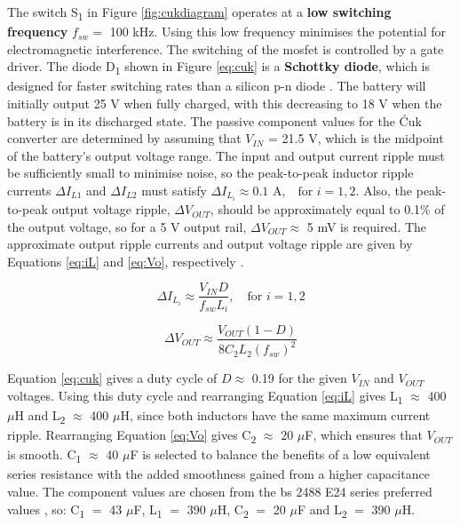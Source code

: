 The switch S\textsubscript{1} in Figure \ref{fig:cukdiagram} operates at a \textbf{low switching frequency} $f_{sw} =$ 100 kHz. Using this low frequency minimises the potential for electromagnetic interference. The switching of the \acrshort{mosfet} is controlled by a gate driver. The diode D\textsubscript{1} shown in Figure \ref{eq:cuk} is a \textbf{Schottky diode}, which is designed for faster switching rates than a silicon p-n diode \cite{Schottky}. The battery will initially output 25 V when fully charged, with this decreasing to 18 V when the battery is in its discharged state. The passive component values for the Ćuk converter are determined by assuming that $V_{IN}$ = 21.5 V, which is the midpoint of the battery's output voltage range. The input and output current ripple must be sufficiently small to minimise noise, so the peak-to-peak inductor ripple currents $\Delta I_{L1}$ and $\Delta I_{L2}$ must satisfy $\Delta I_{L_{i}} \approx 0.1$ A,$\quad \text{for } i = 1, 2$. Also, the peak-to-peak output voltage ripple, $\Delta V_{OUT}$, should be approximately equal to 0.1\% of the output voltage, so for a 5 V output rail,  $\Delta V_{OUT} \approx $ 5 mV is required. The approximate output ripple currents and output voltage ripple are given by Equations \ref{eq:iL} and \ref{eq:Vo}, respectively \cite{EricksonRobertW2020FoPE}.

\begin{equation}
\Delta I_{L_{i}} \approx \frac{ V_{IN} D}{ f_{sw} L_i}, \quad \text{for } i = 1, 2
\label{eq:iL}
\end{equation}

\begin{equation}
\Delta V_{OUT} \approx \frac{V_{OUT} (1 - D)}{8C_2 L_2 (f_{sw})^2}
\label{eq:Vo}
\end{equation}


Equation \ref{eq:cuk} gives a duty cycle of $D \approx$ 0.19 for the given $V_{IN}$ and $V_{OUT}$ voltages. Using this duty cycle and rearranging Equation \ref{eq:iL} gives L\textsubscript{1} $\approx$ 400 $\mu$H and L\textsubscript{2} $\approx$ 400 $\mu$H, since both inductors have the same maximum current ripple. Rearranging Equation \ref{eq:Vo} gives C\textsubscript{2} $\approx$ 20 $\mu$F, which ensures that $V_{OUT}$ is smooth. C\textsubscript{1} $\approx$ 40 $\mu$F is selected to balance the benefits of a low equivalent series resistance with the added smoothness gained from a higher capacitance value.  The component values are chosen from the \acrshort{bs} 2488 E24 series preferred values \cite{HLT}, so: C\textsubscript{1} $=$ 43 $\mu$F, L\textsubscript{1} $=$ 390 $\mu$H, C\textsubscript{2} $=$ 20 $\mu$F and  L\textsubscript{2} $=$ 390 $\mu$H. 

